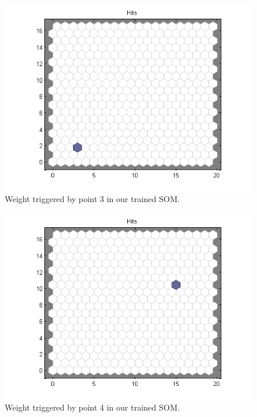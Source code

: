 \documentclass[a4paper]{article}
\begin{document}
 \begin{figure}[H] %
	 \includegraphics[]{point3.png}
	 \caption{\label{fig:point3} Weight triggered by point 3 in our trained SOM.}
 \end{figure}
 \begin{figure}[H] %
	 \includegraphics[]{point4.png}
	 \caption{\label{fig:point4} Weight triggered by point 4 in our trained SOM.}
 \end{figure}
\end{document}

